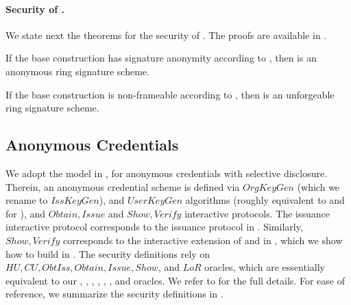 
\paragraph{Security of \CUASRing.} %
We state next the theorems for the security of \CUASRing. The proofs are
available in .

\begin{theorem}
  If the base \CUASGen construction has signature anonymity according to
  , then \CUASRing is an anonymous ring signature
  scheme.
\end{theorem}

\begin{theorem}
  If the base \CUASGen construction is non-frameable according to
  , then \CUASRing is an unforgeable ring signature
  scheme.
\end{theorem}

\subsection{Anonymous Credentials}
\label{ssec:related-models-ac}

We adopt the model in \cite{fhs19}, for anonymous credentials with selective
disclosure. Therein, an anonymous credential scheme is
defined via $OrgKeyGen$ (which we rename to $IssKeyGen$), and $UserKeyGen$
algorithms (roughly equivalent to
\IKeyGen and \UKeyGen for \UAS), and $Obtain,Issue$ and $Show,Verify$
interactive protocols. The issuance interactive protocol corresponds to
the issuance protocol in \UAS. Similarly, $Show,Verify$ corresponds to
the interactive extension of \Sign and \Verify in \UAS, which we show how
to build in . The security definitions rely on
$HU, CU, ObtIss, Obtain, Issue,Show$, and $LoR$ oracles, which are essentially
equivalent to our \HUGEN, \CUGEN, \OBTISS, \OBTAIN, \ISSUE, \SIGN, and \CHALb
oracles. We refer to \cite{fhs19} for the full details. For ease of reference,
we summarize the security definitions in .%

